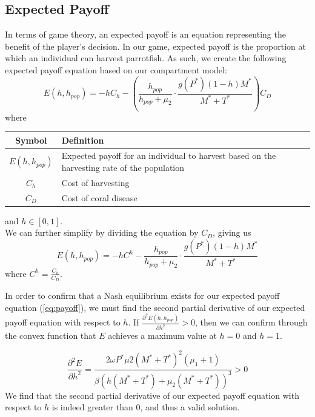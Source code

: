 \documentclass[12pt]{article}
\begin{document}
\subsection{Expected Payoff}
In terms of game theory, an expected payoff is an equation representing the benefit of the player's decision. In our game, expected payoff is the proportion at which an individual can harvest parrotfish. As such, we create the following expected payoff equation based on our compartment model:
\begin{equation*}\label{eq:initial_payoff}
    \displaystyle {E(h, h_{pop}) = -hC_{h} - \left( \frac{h_{pop}}{h_{pop} + \mu_{2}} \cdot \frac{g(P^{*})(1-h)M^{*}}{M^{*} + T^{*}} \right) C_{D}}
\end{equation*}
where
\begin{table}[H]
    \centering
    \begin{tabular}{c|p{9cm}}
         Symbol & Definition \\
         \hline
         $E(h, h_{pop})$ & Expected payoff for an individual to harvest based on the harvesting rate of the population \\
         $C_{h}$ & Cost of harvesting \\
         $C_{D}$ & Cost of coral disease \\
    \end{tabular}
    \label{tab:payoff_eq_params}
\end{table}
and $h \in [0,1]$. \\
We can further simplify by dividing the equation by $C_{D}$, giving us 
\begin{equation*}\label{eq:payoff}
    \displaystyle {E(h, h_{pop}) = -hC^{h} - \frac{h_{pop}}{h_{pop} + \mu_{2}} \cdot \frac{g(P^{*})(1-h)M^{*}}{M^{*} + T^{*}}}
\end{equation*}
where $C^{h} = \frac{C_{h}}{C_{D}}$. \\ \par
In order to confirm that a Nash equilibrium exists for our expected payoff equation (\ref{eq:payoff}), we must find the second partial derivative of our expected payoff equation with respect to $h$. If $\frac{\partial^{2}E(h, h_{pop})}{\partial h^{2}} > 0$, then we can confirm through the convex function that $E$ achieves a maximum value at $h=0$ and $h=1$. \par
\begin{equation*}\label{eq:nash_partial_deriv}
    \displaystyle {\frac{\partial ^ {2} E}{\partial h^{2}} = \frac{2 \omega P^{*} \mu{2} (M^{*}+T^{*})^{2} (\mu_{1} +1)}{\beta(h(M^{*}+T^{*}) + \mu_{2}(M^{*}+T^{*}))^{3}} > 0}
\end{equation*}
We find that the second partial derivative of our expected payoff equation with respect to $h$ is indeed greater than 0, and thus a valid solution.
\end{document}
